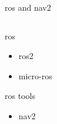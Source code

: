 
\begin{frame}{\acs{ros} and nav2}

    \begin{columns}[T]
        \begin{column}{0.5\textwidth}
        
            \acf{ros}
            \begin{itemize}
                \item \acs{ros2}
                \item \acs{micro-ros}
            \end{itemize}

            \ac{ros} tools
            \begin{itemize}
                \item nav2
            \end{itemize}

        \end{column}
        \begin{column}{0.5\textwidth}

            \begin{adjustbox}{scale=0.6,center,margin={-1cm,3cm,0cm,0cm}}
                
            \end{adjustbox}
    
        \end{column}
    \end{columns}
    
\end{frame}

